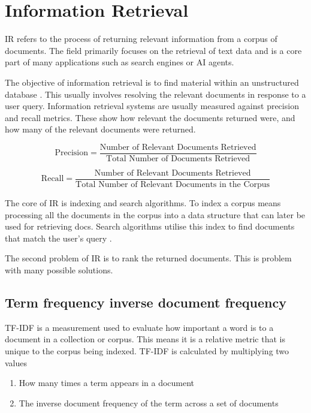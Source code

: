 \section{Information Retrieval}


\gls{IR} refers to the process of returning relevant information from a corpus of documents. The field primarily focuses on the retrieval of text data and is a core part of many applications such as search engines or AI agents.


The objective of information retrieval is to find material within an unstructured database \cite{christopher_d_introduction_2008}. This usually involves resolving the relevant documents in response to a user query. Information retrieval systems are usually measured against precision and recall metrics. These show how relevant the documents returned were, and how many of the relevant documents were returned.


\begin{equation}
        \text{Precision} = \frac{\text{Number of Relevant Documents Retrieved}}{\text{Total Number of Documents Retrieved}}
\end{equation}


\begin{equation}
        \text{Recall} = \frac{\text{Number of Relevant Documents Retrieved}}{\text{Total Number of Relevant Documents in the Corpus}}
\end{equation}


The core of \gls{IR} is indexing and search algorithms. To index a corpus means processing all the documents in the corpus into a data structure that can later be used for retrieving docs. Search algorithms utilise this index to find documents that match the user's query \cite{christopher_d_introduction_2008}.


The second problem of IR is to rank the returned documents. This is problem with many possible solutions.


\subsection{Term frequency inverse document frequency}
\label{sec:background_tfidf}


\gls{TF-IDF} is a measurement used to evaluate how important a word is to a document in a collection or corpus. This means it is a relative metric that is unique to the corpus being indexed. TF-IDF is calculated by multiplying two values


\begin{enumerate}
        \item How many times a term appears in a document
        \item The inverse document frequency of the term across a set of documents
\end{enumerate}



